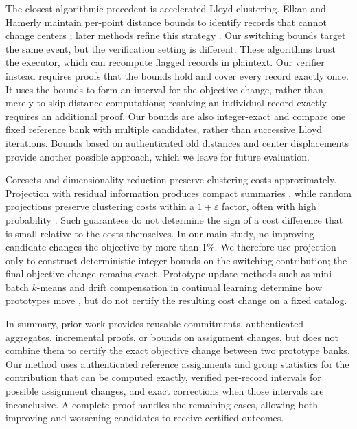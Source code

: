 \documentclass[5p,times,twocolumn]{elsarticle}
\begin{document}
The closest algorithmic precedent is accelerated Lloyd
clustering. Elkan and Hamerly maintain per-point distance
bounds to identify records that cannot change centers
\cite{elkan2003using,hamerly2010making}; later methods refine
this strategy \cite{hamerly2015accelerating,ding2015yinyang,
newling2016fast,xia2020ball}. Our switching bounds target the
same event, but the verification setting is different. These
algorithms trust the executor, which can recompute flagged
records in plaintext. Our verifier instead requires proofs that
the bounds hold and cover every record exactly once. It uses
the bounds to form an interval for the objective change, rather
than merely to skip distance computations; resolving an
individual record exactly requires an additional proof. Our
bounds are also integer-exact and compare one fixed reference
bank with multiple candidates, rather than successive Lloyd
iterations. Bounds based on authenticated old distances and
center displacements provide another possible approach, which
we leave for future evaluation.

Coresets and dimensionality reduction preserve clustering costs
approximately. Projection with residual information produces
compact summaries \cite{feldman2013tiny,feldman2020tiny}, while
random projections preserve clustering costs within a
$1+\varepsilon$ factor, often with high probability
\cite{cohen2015dimensionality,makarychev2019performance}.
Such guarantees do not determine the sign of a cost difference
that is small relative to the costs themselves. In our main
study, no improving candidate changes the objective by more
than 1\%. We therefore use projection only to construct
deterministic integer bounds on the switching contribution;
the final objective change remains exact. Prototype-update
methods such as mini-batch $k$-means and drift compensation
in continual learning determine how prototypes move
\cite{sculley2010web,gomezvilla2024ldc}, but do not certify
the resulting cost change on a fixed catalog.

In summary, prior work provides reusable commitments,
authenticated aggregates, incremental proofs, or bounds on
assignment changes, but does not combine them to certify the
exact objective change between two prototype banks. Our method
uses authenticated reference assignments and group statistics
for the contribution that can be computed exactly, verified
per-record intervals for possible assignment changes, and
exact corrections when those intervals are inconclusive.
A complete proof handles the remaining cases, allowing both
improving and worsening candidates to receive certified
outcomes.
\end{document}

